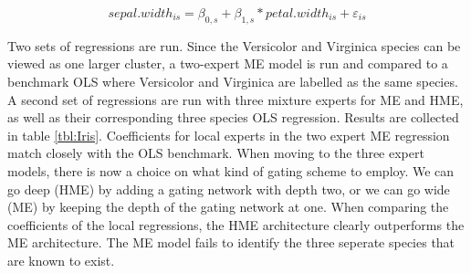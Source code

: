 \documentclass[12pt]{article}
\begin{document}
\begin{equation} \label{eq:OLS_iris}
    sepal.width_{is} = \beta_{0,s} + \beta_{1, s} * petal.width_{is} + \varepsilon_{is}
\end{equation}

Two sets of regressions are run. Since the Versicolor and Virginica species
can be viewed as one larger cluster, a two-expert ME model is run
and compared to a benchmark OLS where Versicolor and Virginica are labelled
as the same species. A second set of regressions are run with three mixture
experts for ME and HME, as well as their corresponding three species OLS
regression. Results are collected in table \ref{tbl:Iris}. Coefficients for
local experts in the two expert ME regression match closely with the OLS
benchmark. When moving to the three expert models, there is now a choice
on what kind of gating scheme to employ. We can go deep (HME) by adding 
a gating network with depth two, or we can go wide (ME) by keeping the
depth of the gating network at one. When comparing the coefficients of the
local regressions, the HME architecture clearly outperforms the ME
architecture. The ME model fails to identify the three seperate
species that are known to exist.  
\end{document}
